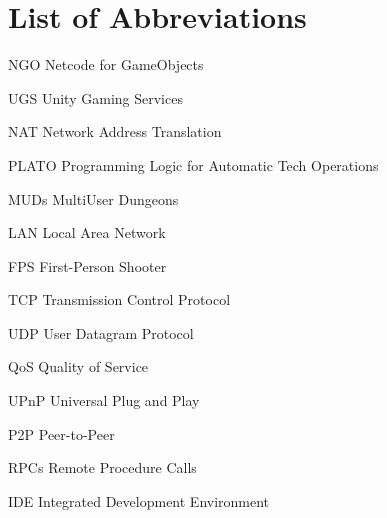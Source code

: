 \chapter*{List of Abbreviations}
\begin{abbrv}
    
    \item[NGO]			Netcode for GameObjects
    \item[UGS]          Unity Gaming Services
    \item[NAT]          Network Address Translation
    \item[PLATO]        Programming Logic for Automatic Tech Operations
    \item[MUDs]         MultiUser Dungeons
    \item[LAN]          Local Area Network
    \item[FPS]          First-Person Shooter
    \item[TCP]          Transmission Control Protocol
    \item[UDP]          User Datagram Protocol
    \item[QoS]          Quality of Service
    \item[UPnP]         Universal Plug and Play
    \item[P2P]          Peer-to-Peer
    \item[RPCs]         Remote Procedure Calls
    \item[IDE]          Integrated Development Environment
    
\end{abbrv}

